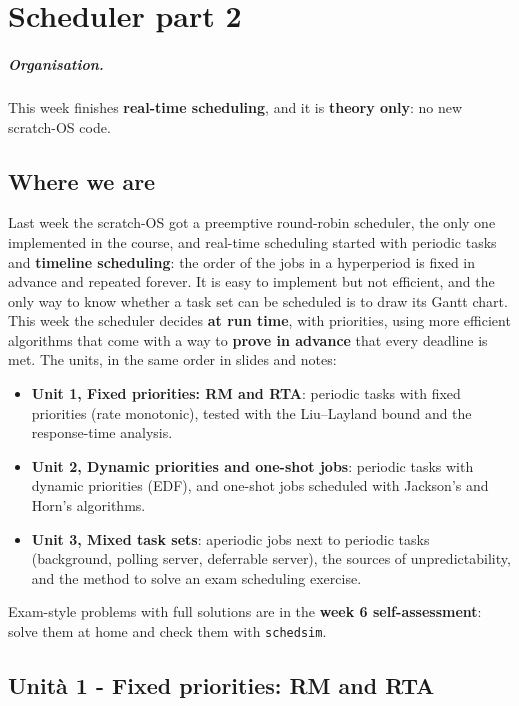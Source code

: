 \chapter{Scheduler part 2}

\paragraph{Organisation.} This week finishes \textbf{real-time scheduling}, and it is \textbf{theory only}: no new scratch-OS code.

\section{Where we are}
Last week the scratch-OS got a preemptive round-robin scheduler, the only one implemented in the course, and real-time scheduling started with periodic tasks and \textbf{timeline scheduling}: the order of the jobs in a hyperperiod is fixed in advance and repeated forever. It is easy to implement but not efficient, and the only way to know whether a task set can be scheduled is to draw its Gantt chart. This week the scheduler decides \textbf{at run time}, with priorities, using more efficient algorithms that come with a way to \textbf{prove in advance} that every deadline is met. The units, in the same order in slides and notes:
\begin{itemize}
    \item \textbf{Unit 1, Fixed priorities: RM and RTA}: periodic tasks with fixed priorities (rate monotonic), tested with the Liu--Layland bound and the response-time analysis.
    \item \textbf{Unit 2, Dynamic priorities and one-shot jobs}: periodic tasks with dynamic priorities (EDF), and one-shot jobs scheduled with Jackson's and Horn's algorithms.
    \item \textbf{Unit 3, Mixed task sets}: aperiodic jobs next to periodic tasks (background, polling server, deferrable server), the sources of unpredictability, and the method to solve an exam scheduling exercise.
\end{itemize}
Exam-style problems with full solutions are in the \textbf{week 6 self-assessment}: solve them at home and check them with \texttt{schedsim}.

\section{Unità 1 - Fixed priorities: RM and RTA}

